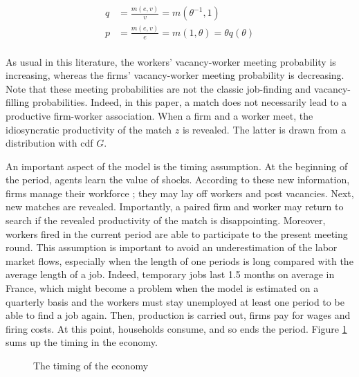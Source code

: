 \documentclass[a4paper]{article}
\begin{document}
\begin{align*}
q &= \frac{m\left(e,v\right)}{v} = m \left( \theta^{-1}, 1\right)\\
p &= \frac{m\left(e,v\right)}{e} = m \left( 1, \theta\right) = \theta q(\theta)\\
\end{align*}

As usual in this literature, the workers' vacancy-worker meeting probability is increasing, whereas the firms' vacancy-worker meeting probability is decreasing. Note that these meeting probabilities are not the classic job-finding and vacancy-filling probabilities. Indeed, in this paper, a match does not necessarily lead to a productive firm-worker association. When a firm and a worker meet, the idiosyncratic productivity of the match $z$ is revealed. The latter is drawn from a distribution with cdf $G$.

An important aspect of the model is the timing assumption. At the beginning of the period, agents learn the value of shocks. According to these new information, firms manage their workforce ; they may lay off workers and post vacancies. Next, new matches are revealed. Importantly, a paired firm and worker may return to search if the revealed productivity of the match is disappointing. Moreover, workers fired in the current period are able to participate to the present meeting round. This assumption is important to avoid an underestimation of the labor market flows, especially when the length of one periods is long compared  with the average length of a job. Indeed, temporary jobs last 1.5 months on average in France, which might become a problem when the model is estimated on a quarterly basis and the workers must stay unemployed at least one period to be able to find a job again. Then, production is carried out, firms pay for wages and firing costs. At this point, households consume, and so ends the period. Figure \ref{timing} sums up the timing in the economy. 

\begin{figure}[H]
\label{timing}
\caption{The timing of the economy}
\end{figure}
\end{document}
